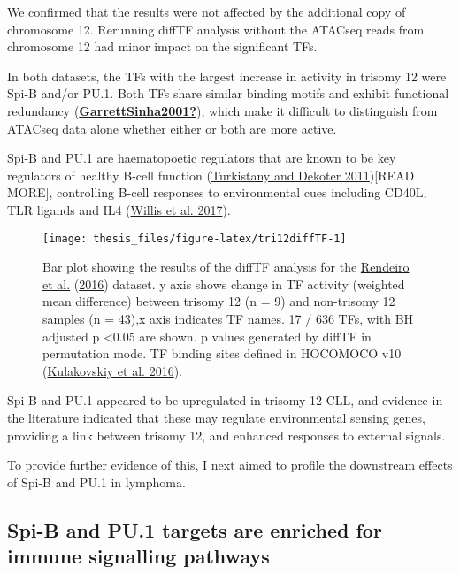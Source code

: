 \documentclass[11pt, a4paper, twosided]{book}
\begin{document}
We confirmed that the results were not affected by the additional copy of chromosome 12. Rerunning diffTF analysis without the ATACseq reads from chromosome 12 had minor impact on the significant TFs.

In both datasets, the TFs with the largest increase in activity in trisomy 12 were Spi-B and/or PU.1. Both TFs share similar binding motifs and exhibit functional redundancy (\protect\hyperlink{ref-GarrettSinha2001}{\textbf{GarrettSinha2001?}}), which make it difficult to distinguish from ATACseq data alone whether either or both are more active.

Spi-B and PU.1 are haematopoetic regulators that are known to be key regulators of healthy B-cell function (\protect\hyperlink{ref-Turkistany2011}{Turkistany and Dekoter 2011}){[}READ MORE{]}, controlling B-cell responses to environmental cues including CD40L, TLR ligands and IL4 (\protect\hyperlink{ref-Willis2017}{Willis et al. 2017}).


\begin{figure}

{\centering \texttt{[image: thesis\_files/figure-latex/tri12diffTF-1]} 

}

\caption{Bar plot showing the results of the diffTF analysis for the \protect\hyperlink{ref-Rendeiro2016}{Rendeiro et al.} (\protect\hyperlink{ref-Rendeiro2016}{2016}) dataset. y axis shows change in TF activity (weighted mean difference) between trisomy 12 (n = 9) and non-trisomy 12 samples (n = 43),x axis indicates TF names. 17 / 636 TFs, with BH adjusted p \textless0.05 are shown. p values generated by diffTF in permutation mode. TF binding sites defined in HOCOMOCO v10 (\protect\hyperlink{ref-HOCOMOCO}{Kulakovskiy et al. 2016}).}\label{fig:tri12diffTF}
\end{figure}
Spi-B and PU.1 appeared to be upregulated in trisomy 12 CLL, and evidence in the literature indicated that these may regulate environmental sensing genes, providing a link between trisomy 12, and enhanced responses to external signals.

To provide further evidence of this, I next aimed to profile the downstream effects of Spi-B and PU.1 in lymphoma.

\hypertarget{spi-b-and-pu.1-targets-are-enriched-for-immune-signalling-pathways}{%
\subsection{Spi-B and PU.1 targets are enriched for immune signalling pathways}\label{spi-b-and-pu.1-targets-are-enriched-for-immune-signalling-pathways}}
\end{document}
